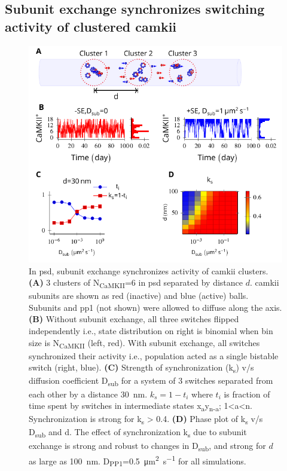 \documentclass[9pt,lineno,doublespacing]{elife}
\newcommand\SUB[2]{#1\textsubscript{#2}}
\begin{document}

\subsection{Subunit exchange synchronizes switching activity of clustered \gls{camkii}}\label{subsec:se_sync_switches}

\begin{figure}%
    \includegraphics[width=114mm]{./PaperFigures/elifeFigure5/figure_sync_114mm.pdf}
    \caption{In \gls{psd}, subunit exchange synchronizes activity of
        \gls{camkii} clusters. \textbf{(A)} 3 clusters of
        N\textsubscript{CaMKII}=6 in \gls{psd} separated by distance \(d\).
        \gls{camkii} subunits are shown as red (inactive) and blue (active)
        balls.  Subunits and \gls{pp1} (not shown) were allowed to diffuse along
        the axis. \textbf{(B)} Without subunit exchange, all three switches
        flipped independently i.e., state distribution on right is binomial when bin size is \SUB{N}{CaMKII}
        (left, red). With subunit exchange, all switches synchronized their activity
        i.e., population acted as a single bistable switch (right, blue).  \textbf{(C)}
        Strength of synchronization (k\textsubscript{s}) v/s diffusion
        coefficient \SUB{D}{sub} for a system of 3 switches separated from each
        other by a distance \SI{30}{\nano \meter}.
        $k_s=1-t_i$ where $t_i$ is fraction of time
        spent by switches in intermediate states
        x\textsubscript{a}y\textsubscript{n-a}; 1\textless{}a\textless{}n.
        Synchronization is strong for k\textsubscript{s} \textgreater{} 0.4.
        \textbf{(D)} Phase plot of \SUB{k}{s} v/s \SUB{D}{sub} and d. The effect
        of synchronization \SUB{k}{s} due to subunit exchange is strong and
        robust to changes in \SUB{D}{sub}, and strong for $d$ as large as
        \SI{100}{\nano\meter}. \SUB{D}{PP1}=\SI{0.5}{\micro\meter\squared\per\second}
        for all simulations. 
    }\label{fig:sync_spread}
\end{figure}
\end{document}
